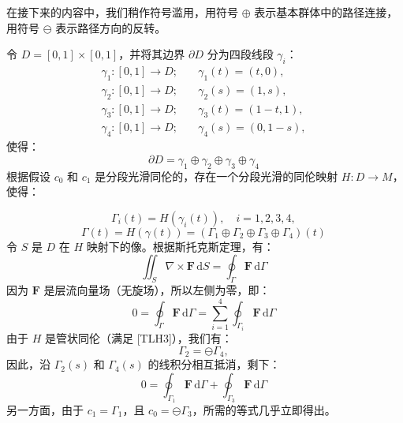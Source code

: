 在接下来的内容中，我们稍作符号滥用，用符号 \(\oplus\) 表示基本群体中的路径连接，用符号 \(\ominus\) 表示路径方向的反转。

令 \(D = [0, 1] \times [0, 1]\)，并将其边界 \(\partial D\) 分为四段线段 \(\gamma_i\)：
\[
\begin{aligned}
\gamma_1: [0, 1] \to D; &\quad \gamma_1(t) = (t, 0), \\
\gamma_2: [0, 1] \to D; &\quad \gamma_2(s) = (1, s), \\
\gamma_3: [0, 1] \to D; &\quad \gamma_3(t) = (1 - t, 1), \\
\gamma_4: [0, 1] \to D; &\quad \gamma_4(s) = (0, 1 - s),
\end{aligned}~
\]
使得：
\[
\partial D = \gamma_1 \oplus \gamma_2 \oplus \gamma_3 \oplus \gamma_4~
\]
根据假设 \(c_0\) 和 \(c_1\) 是分段光滑同伦的，存在一个分段光滑的同伦映射 \(H: D \to M\)，使得：

\[
\Gamma_i(t) = H(\gamma_i(t)), \quad i = 1, 2, 3, 4,~
\]
\[
\Gamma(t) = H(\gamma(t)) = (\Gamma_1 \oplus \Gamma_2 \oplus \Gamma_3 \oplus \Gamma_4)(t)~
\]
令 \(S\) 是 \(D\) 在 \(H\) 映射下的像。根据斯托克斯定理，有：
\[
\iint_S \nabla \times \mathbf{F} \, \mathrm{d}S = \oint_\Gamma \mathbf{F} \, \mathrm{d}\Gamma~
\]
因为 \(\mathbf{F}\) 是层流向量场（无旋场），所以左侧为零，即：
\[
0 = \oint_\Gamma \mathbf{F} \, \mathrm{d}\Gamma = \sum_{i=1}^{4} \oint_{\Gamma_i} \mathbf{F} \, \mathrm{d}\Gamma~
\]
由于 \(H\) 是管状同伦（满足 [TLH3]），我们有：
\[
\Gamma_2 = \ominus \Gamma_4,~
\]
因此，沿 \(\Gamma_2(s)\) 和 \(\Gamma_4(s)\) 的线积分相互抵消，剩下：
\[
0 = \oint_{\Gamma_1} \mathbf{F} \, \mathrm{d}\Gamma + \oint_{\Gamma_3} \mathbf{F} \, \mathrm{d}\Gamma~
\]
另一方面，由于 \(c_1 = \Gamma_1\)，且 \(c_0 = \ominus \Gamma_3\)，所需的等式几乎立即得出。